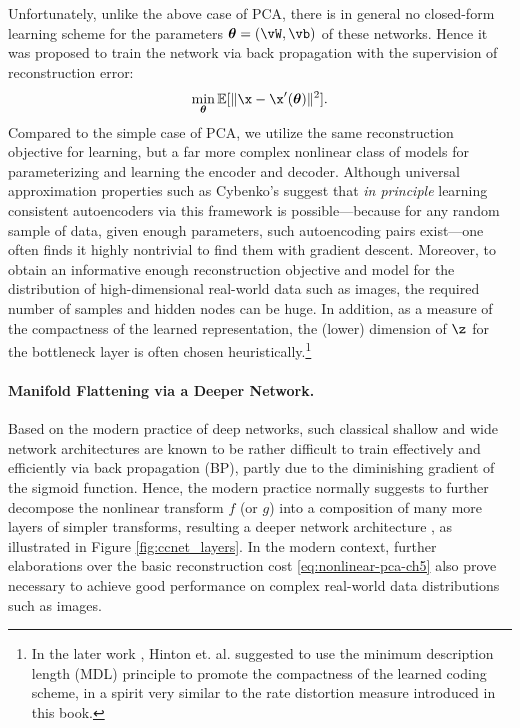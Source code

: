 \documentclass[../../book-main.tex]{subfiles}
\begin{document}
Unfortunately, unlike the above case of PCA, there is in general no
closed-form learning scheme for the parameters $\boldsymbol{\theta} =
(\vW, \vb)$ of these networks. Hence it was proposed to train the
network via back propagation with the supervision of reconstruction error:
\begin{equation}\label{eq:nonlinear-pca-ch5}
  \min_{\boldsymbol{\theta}} \mathbb{E}[ \|\x - \x'(\boldsymbol{\theta})\|^2].
\end{equation}
Compared to the simple case of PCA, we utilize the same reconstruction objective
for learning, but a far more complex nonlinear class of models for
parameterizing and learning the encoder and decoder. Although universal
approximation properties such as Cybenko's suggest that \textit{in principle}
learning consistent autoencoders via this framework is possible---because for
any random sample of data, given enough parameters, such autoencoding pairs
exist---one often finds it highly nontrivial to find them with gradient descent.
Moreover, to obtain an informative enough reconstruction objective
and model for the
distribution of high-dimensional real-world data such as images, the required
number of samples and hidden nodes can be huge.
In addition, as a measure of the compactness of the learned representation, the
(lower) dimension of $\z$ for the bottleneck layer is often chosen
heuristically.\footnote{In the later work \cite{Hinton-1993}, Hinton et.
  al. suggested to use the minimum description length (MDL) principle to promote
  the compactness of the learned coding scheme, in a spirit very similar to the
rate distortion measure introduced in this book.}

\paragraph{Manifold Flattening via a Deeper Network.}
Based on the modern practice of deep networks, such classical shallow
and wide network architectures are known to be rather difficult to
train effectively and efficiently via back propagation (BP), partly
due to the diminishing gradient of the sigmoid function. Hence, the
modern practice normally suggests to further
decompose the nonlinear transform $f$ (or $g$) into a composition of
many more layers of simpler transforms, resulting a deeper network architecture
\cite{Hinton504}, as illustrated in Figure \ref{fig:ccnet_layers}.
In the modern context, further elaborations over the basic reconstruction cost
\eqref{eq:nonlinear-pca-ch5} also prove necessary to achieve good performance on
complex real-world data distributions such as images.
\end{document}
